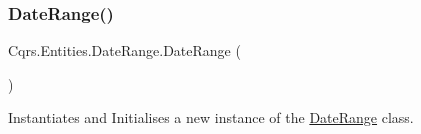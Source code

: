 \subsubsection{\texorpdfstring{Date\+Range()}{DateRange()}}
{\footnotesize\ttfamily Cqrs.\+Entities.\+Date\+Range.\+Date\+Range (\begin{DoxyParamCaption}{ }\end{DoxyParamCaption})}



Instantiates and Initialises a new instance of the \hyperlink{classCqrs_1_1Entities_1_1DateRange}{Date\+Range} class. 

